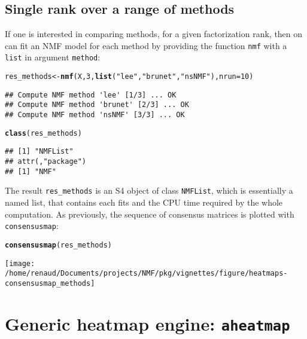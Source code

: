 \documentclass[a4paper]{article}\usepackage{graphicx, color}
\makeatletter
\def\maxwidth{ %
  \ifdim\Gin@nat@width>\linewidth
    \linewidth
  \else
    \Gin@nat@width
  \fi
}
\newcommand{\hlfunctioncall}[1]{\textcolor[rgb]{0.501960784313725,0,0.329411764705882}{\textbf{#1}}}%
\newcommand{\hlstring}[1]{\textcolor[rgb]{0.6,0.6,1}{#1}}%
\newenvironment{kframe}{%
 \def\at@end@of@kframe{}%
 \ifinner\ifhmode%
  \def\at@end@of@kframe{\end{minipage}}%
  \begin{minipage}{\columnwidth}%
 \fi\fi%
 \def\FrameCommand##1{\hskip\@totalleftmargin \hskip-\fboxsep
 \colorbox{shadecolor}{##1}\hskip-\fboxsep
     \hskip-\linewidth \hskip-\@totalleftmargin \hskip\columnwidth}%
 \MakeFramed {\advance\hsize-\width
   \@totalleftmargin\z@ \linewidth\hsize
   \@setminipage}}%
 {\par\unskip\endMakeFramed%
 \at@end@of@kframe}
\newenvironment{knitrout}{}{} %
\let\code=\texttt
\makeatother
\begin{document}
\subsection{Single rank over a range of methods}
If one is interested in comparing methods, for a given factorization rank, then 
on can fit an NMF model for each method by providing the function \code{nmf} with 
a \code{list} in argument \code{method}:

\begin{knitrout}
\color{fgcolor}\begin{kframe}
\begin{alltt}
res_methods <- \hlfunctioncall{nmf}(X, 3, \hlfunctioncall{list}(\hlstring{"lee"}, \hlstring{"brunet"}, \hlstring{"nsNMF"}), nrun = 10)
\end{alltt}
\begin{verbatim}
## Compute NMF method 'lee' [1/3] ... OK
## Compute NMF method 'brunet' [2/3] ... OK
## Compute NMF method 'nsNMF' [3/3] ... OK
\end{verbatim}
\begin{alltt}
\hlfunctioncall{class}(res_methods)
\end{alltt}
\begin{verbatim}
## [1] "NMFList"
## attr(,"package")
## [1] "NMF"
\end{verbatim}
\end{kframe}
\end{knitrout}


The result \code{res\_methods} is an S4 object of class \code{NMFList}, which 
is essentially a named list, that contains each fits and the CPU time required 
by the whole computation.
As previously, the sequence of consensus matrices is plotted with \code{consensusmap}:

\begin{knitrout}
\color{fgcolor}\begin{kframe}
\begin{alltt}
\hlfunctioncall{consensusmap}(res_methods)
\end{alltt}
\end{kframe}\texttt{[image: /home/renaud/Documents/projects/NMF/pkg/vignettes/figure/heatmaps-consensusmap\_methods]} 
\end{knitrout}


\section{Generic heatmap engine: \texttt{aheatmap}}
\label{sec:aheatmap}
\end{document}

